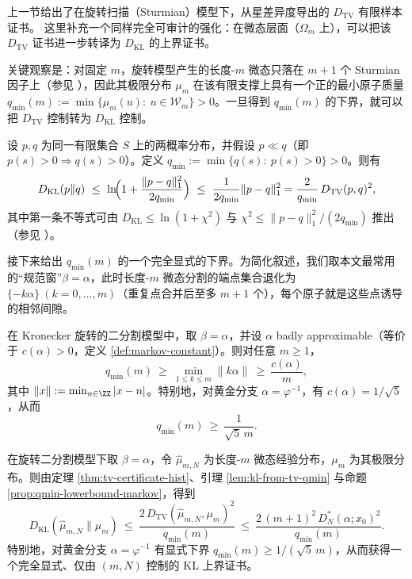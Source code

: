 上一节给出了在旋转扫描（Sturmian）模型下，从星差异度导出的 \(D_{\mathrm{TV}}\) 有限样本证书。
这里补充一个同样完全可审计的强化：在微态层面（\(\Omega_m\) 上），可以把该 \(D_{\mathrm{TV}}\) 证书进一步转译为 \(D_{\mathrm{KL}}\) 的上界证书。

关键观察是：对固定 \(m\)，旋转模型产生的长度-\(m\) 微态只落在 \(m{+}1\) 个 Sturmian 因子上（参见 \cite{MorseHedlund1940,LindMarcus1995}），因此其极限分布 \(\mu_m\) 在该有限支撑上具有一个正的最小原子质量
\(
q_{\min}(m):=\min\{\mu_m(u):\ u\in\mathcal{W}_m\}>0
\)。一旦得到 \(q_{\min}(m)\) 的下界，就可以把 \(D_{\mathrm{TV}}\) 控制转为 \(D_{\mathrm{KL}}\) 控制。

\begin{lemma}[从 TV 到 KL：由最小原子下界给出的显式上界]\label{lem:kl-from-tv-qmin}
设 \(p,q\) 为同一有限集合 \(S\) 上的两概率分布，并假设 \(p\ll q\)（即 \(p(s)>0\Rightarrow q(s)>0\)）。定义
\(
q_{\min}:=\min\{q(s):\ p(s)>0\}>0
\)。则有
\[
D_{\mathrm{KL}}(p\|q)\ \le\ \ln\!\Bigl(1+\frac{\|p-q\|_1^2}{2q_{\min}}\Bigr)
\ \le\ \frac{1}{2q_{\min}}\|p-q\|_1^2
=\frac{2}{q_{\min}}\,D_{\mathrm{TV}}(p,q)^2,
\]
其中第一条不等式可由 \(D_{\mathrm{KL}}\le \ln(1+\chi^2)\) 与 \(\chi^2\le \|p-q\|_1^2/(2q_{\min})\) 推出（参见 \cite{SasonVerdu2016fDivergence}）。
\end{lemma}

接下来给出 \(q_{\min}(m)\) 的一个完全显式的下界。为简化叙述，我们取本文最常用的“规范窗”\(\beta=\alpha\)，此时长度-\(m\) 微态分割的端点集合退化为 \(\{ -k\alpha\}\ (k=0,\dots,m)\)（重复点合并后至多 \(m{+}1\) 个），每个原子就是这些点诱导的相邻间隙。

\begin{proposition}\label{prop:qmin-lowerbound-markov}
在 Kronecker 旋转的二分割模型中，取 \(\beta=\alpha\)，并设 \(\alpha\) badly approximable（等价于 \(c(\alpha)>0\)，定义 \ref{def:markov-constant}）。则对任意 \(m\ge 1\)，
\[
q_{\min}(m)\ \ge\ \min_{1\le k\le m}\|k\alpha\|\ \ge\ \frac{c(\alpha)}{m},
\]
其中 \(\|x\|:=\min_{n\in\ZZ}|x-n|\)。特别地，对黄金分支 \(\alpha=\varphi^{-1}\)，有 \(c(\alpha)=1/\sqrt5\)，从而
\[
q_{\min}(m)\ \ge\ \frac{1}{\sqrt5\,m}.
\]
\end{proposition}

\begin{corollary}[旋转微态的 KL 证书（显式）]\label{cor:rotation-microstate-kl-certificate}
在旋转二分割模型下取 \(\beta=\alpha\)，令 \(\hat\mu_{m,N}\) 为长度-\(m\) 微态经验分布，\(\mu_m\) 为其极限分布。则由定理 \ref{thm:tv-certificate-hist}、引理 \ref{lem:kl-from-tv-qmin} 与命题 \ref{prop:qmin-lowerbound-markov}，得到
\[
D_{\mathrm{KL}}(\hat\mu_{m,N}\|\mu_m)
\ \le\ \frac{2\,D_{\mathrm{TV}}(\hat\mu_{m,N},\mu_m)^2}{q_{\min}(m)}
\ \le\ \frac{2\,(m+1)^2\,D_N^*(\alpha;x_0)^2}{q_{\min}(m)}.
\]
特别地，对黄金分支 \(\alpha=\varphi^{-1}\) 有显式下界 \(q_{\min}(m)\ge 1/(\sqrt5\,m)\)，从而获得一个完全显式、仅由 \((m,N)\) 控制的 KL 上界证书。
\end{corollary}

